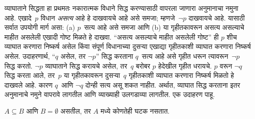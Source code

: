 व्याघाताने सिद्धता हा प्रथमतः नकारात्मक विधाने सिद्ध करण्यासाठी वापरला जाणारा अनुमानाचा नमुना आहे. एखादे~$p$ विधान \emph{असत्य} आहे हे दाखवायचे आहे असे समजा; म्हणजे~$\lnot p$ दाखवायचे आहे. यासाठी सर्वात उपयोगी मार्ग असा: (a) $p$~सत्य आहे असे समजा आणि (b) या गृहीतकावरून असत्य असल्याचे माहीत असलेली एखादी गोष्ट मिळते हे दाखवा. “असत्य असल्याचे माहीत असलेली गोष्ट” ही $p$ शीच व्याघात करणारा निष्कर्ष असेल किंवा संपूर्ण विधानाच्या दुसऱ्या एखाद्या गृहीतकाशी व्याघात करणारा निष्कर्ष असेल. उदाहरणार्थ, “$q$ असेल, तर $\lnot p$” सिद्ध करताना $q$~सत्य आहे असे गृहीत धरून त्यावरून~$\lnot p$ सिद्ध करतो. $\lnot p$ व्याघाताने सिद्ध करायचे असेल, तर~$q$ बरोबर $p$ हेदेखील गृहीत धरायचे. $p$ वरून $\lnot q$ सिद्ध करता आले, तर~$p$ या गृहीतकावरून दुसऱ्या~$q$ गृहीतकाशी व्याघात करणारा निष्कर्ष मिळतो हे दाखवले आहे. कारण $q$~आणि $\lnot q$ दोन्ही सत्य असू शकत नाहीत. अर्थात, व्याघात सिद्ध करताना इतर अनुमानाचे नमुने वापरावे लागतील आणि व्याख्याही उलगडाव्या लागतील. एक उदाहरण पाहू.

\begin{prop}
$A \subseteq B$ आणि $B = \emptyset$ असतील, तर $A$ मध्ये कोणतेही घटक नसतात.
\end{prop}

